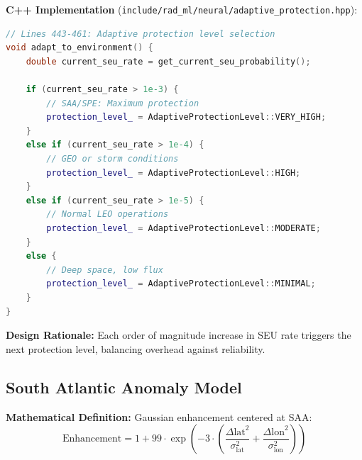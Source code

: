 \documentclass[11pt,a4paper]{article}
\begin{document}
\textbf{C++ Implementation} (\texttt{include/rad\_ml/neural/adaptive\_protection.hpp}):
\begin{lstlisting}[language=C++, basicstyle=\small\ttfamily]
// Lines 443-461: Adaptive protection level selection
void adapt_to_environment() {
    double current_seu_rate = get_current_seu_probability();

    if (current_seu_rate > 1e-3) {
        // SAA/SPE: Maximum protection
        protection_level_ = AdaptiveProtectionLevel::VERY_HIGH;
    }
    else if (current_seu_rate > 1e-4) {
        // GEO or storm conditions
        protection_level_ = AdaptiveProtectionLevel::HIGH;
    }
    else if (current_seu_rate > 1e-5) {
        // Normal LEO operations
        protection_level_ = AdaptiveProtectionLevel::MODERATE;
    }
    else {
        // Deep space, low flux
        protection_level_ = AdaptiveProtectionLevel::MINIMAL;
    }
}
\end{lstlisting}

\textbf{Design Rationale:} Each order of magnitude increase in SEU rate triggers the next protection level, balancing overhead against reliability.

\subsection{South Atlantic Anomaly Model}

\textbf{Mathematical Definition:} Gaussian enhancement centered at SAA:
\begin{equation}
\text{Enhancement} = 1 + 99 \cdot \exp\left(-3 \cdot \left(\frac{\Delta\text{lat}^2}{\sigma_\text{lat}^2} + \frac{\Delta\text{lon}^2}{\sigma_\text{lon}^2}\right)\right)
\end{equation}
\end{document}
